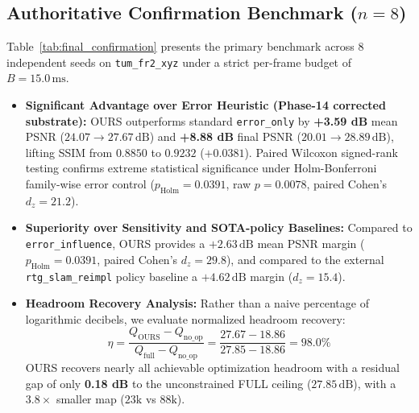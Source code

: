 \documentclass[10pt,twocolumn,letterpaper]{article}
\begin{document}
\subsection{Authoritative Confirmation Benchmark (\texorpdfstring{$n=8$}{n=8})}
Table~\ref{tab:final_confirmation} presents the primary benchmark across 8 independent seeds on \texttt{tum\_fr2\_xyz} under a strict per-frame budget of $B = 15.0\,\mathrm{ms}$.
\begin{itemize}
\setlength{\itemsep}{2pt}
\item \textbf{Significant Advantage over Error Heuristic (Phase-14 corrected substrate):} OURS outperforms standard \texttt{error\_only} by \textbf{+3.59 dB} mean PSNR ($24.07 \to 27.67\,\mathrm{dB}$) and \textbf{+8.88 dB} final PSNR ($20.01 \to 28.89\,\mathrm{dB}$), lifting SSIM from $0.8850$ to $0.9232$ ($+0.0381$). Paired Wilcoxon signed-rank testing confirms extreme statistical significance under Holm-Bonferroni family-wise error control ($p_{\mathrm{Holm}} = 0.0391$, raw $p = 0.0078$, paired Cohen's $d_z = 21.2$).
\item \textbf{Superiority over Sensitivity and SOTA-policy Baselines:} Compared to \texttt{error\_influence}, OURS provides a $+2.63\,\mathrm{dB}$ mean PSNR margin ($p_{\mathrm{Holm}} = 0.0391$, paired Cohen's $d_z = 29.8$), and compared to the external \texttt{rtg\_slam\_reimpl} policy baseline a $+4.62\,\mathrm{dB}$ margin ($d_z = 15.4$).
\item \textbf{Headroom Recovery Analysis:} Rather than a naive percentage of logarithmic decibels, we evaluate normalized headroom recovery:
\begin{equation}
\eta = \frac{Q_{\mathrm{OURS}} - Q_{\mathrm{no\_op}}}{Q_{\mathrm{full}} - Q_{\mathrm{no\_op}}} = \frac{27.67 - 18.86}{27.85 - 18.86} = \mathbf{98.0\%}
\end{equation}
OURS recovers nearly all achievable optimization headroom with a residual gap of only \textbf{0.18 dB} to the unconstrained FULL ceiling ($27.85\,\mathrm{dB}$), with a $3.8\times$ smaller map ($23\mathrm{k}$ vs $88\mathrm{k}$).
\end{itemize}
\end{document}

